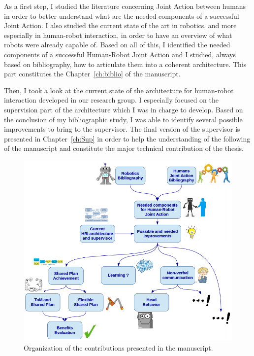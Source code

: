 \documentclass[english,a4paper,11pt,twoside]{StyleThese}
\begin{document}
As a first step, I studied the literature concerning Joint Action between humans in order to better understand what are the needed components of a successful Joint Action. I also studied the current state of the art in robotics, and more especially in human-robot interaction, in order to have an overview of what robots were already capable of. Based on all of this, I identified the needed components of a successful Human-Robot Joint Action and I studied, always based on bibliography, how to articulate them into a coherent architecture. This part constitutes the Chapter~\ref{ch:biblio} of the manuscript.

Then, I took a look at the current state of the architecture for human-robot interaction developed in our research group. I especially focused on the supervision part of the architecture which I was in charge to develop. Based on the conclusion of my bibliographic study, I was able to identify several possible improvements to bring to the supervisor. The final version of the supervisor is presented in Chapter~\ref{ch:Sup} in order to help the understanding of the following of the manuscript and constitute the major technical contribution of the thesis.

\begin{figure}[!t]
	\centering
    \includegraphics[width=\textwidth]{figs/Introduction/Plan.png}
    \caption{Organization of the contributions presented in the manuscript.}
    \label{fig:planIntro}
\end{figure}
\end{document}
